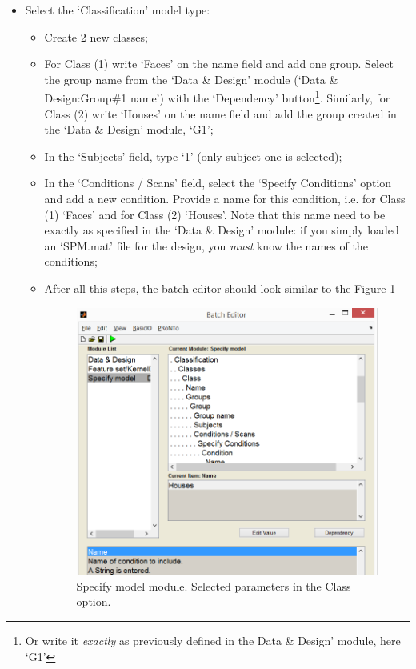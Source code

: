\begin{itemize}
	\item Select the `Classification' model type:
	
		\begin{itemize}
		
		\item Create 2 new classes;
		
		\item For Class (1) write `Faces' on the name field and add one group. Select the group name from the `Data \& Design' module (`Data \& Design:Group\#1 name') with the `Dependency' button\footnote{Or write it {\it exactly} as previously defined in the Data \& Design' module, here `G1'}. Similarly, for Class (2) write `Houses' on the name field and add the group created in the `Data \& Design' module, `G1';	
		
		\item In the `Subjects' field, type `1' (only subject one is selected);
		
		\item In the `Conditions / Scans' field, select the `Specify Conditions' option and add a new condition. Provide a name for this condition, i.e. for Class (1) `Faces' and for Class (2) `Houses'. Note that this name need to be exactly as specified in the `Data \& Design' module: if you simply loaded an `SPM.mat' file for the design, you {\it must} know the names of the conditions;
		
		\item After all this steps, the batch editor should look similar to the Figure \ref{fig:batchClassMKL}	
	
	\begin{figure}[!h]
	\centering
		\includegraphics[scale=0.6]{images/Tutorial/mkl/batchClassMKL.png}
	\caption{Specify model module. Selected parameters in the Class option.}
	\label{fig:batchClassMKL}
\end{figure}


\end{itemize}
\end{itemize}
